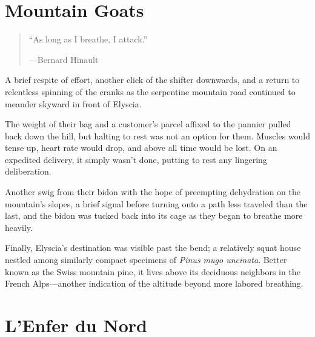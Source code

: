 \documentclass[12pt]{octavo}
\begin{document}
\tableofcontents
\chapter{Mountain Goats}
\begin{quote}
``As long as I breathe, I attack.''
\begin{flushright}
---Bernard Hinault
\end{flushright}
\end{quote}

A brief respite of effort, another click of the shifter downwards, and a return 
to relentless spinning of the cranks as the serpentine mountain road continued 
to meander skyward in front of Elyscia.

The weight of their bag and a customer's parcel affixed to the pannier pulled 
back  down the hill, but halting to rest was not an option for them. Muscles 
would  tense up, heart rate would drop, and above all time would be lost. On an 
expedited delivery, it simply wasn't done, putting to rest any lingering 
deliberation.

Another swig from their bidon with the hope of preempting dehydration on the 
mountain's slopes, a brief signal before turning onto a path less traveled than 
the last, and the bidon was tucked back into its cage as they began to breathe 
more heavily.

Finally, Elyscia's destination was visible past the bend; a relatively squat 
house nestled among similarly compact specimens of \textit{Pinus mugo 
uncinata}. Better known as the Swiss mountain pine, it lives above its 
deciduous neighbors in the French Alps---another indication of the altitude 
beyond more labored breathing.
\chapter{L'Enfer du Nord}
\end{document}
